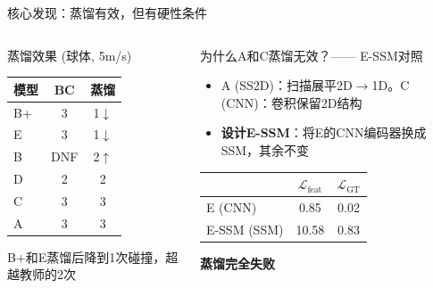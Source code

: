 \documentclass[aspectratio=169,10pt]{beamer}
\newcommand{\pos}[1]{\textcolor{positive}{#1}}
\newcommand{\con}[1]{\textcolor{negative}{#1}}
\newcommand{\HL}[1]{\textcolor{emphasis}{#1}}
\begin{document}
\begin{frame}{核心发现：蒸馏有效，但有硬性条件}
\begin{columns}[T]
\begin{block}{蒸馏效果 (球体, 5m/s)}
\centering\footnotesize
\begin{tabular}{lcc}
\toprule
模型 & BC & 蒸馏 \\
\midrule
\HL{B+} & 3 & \HL{1}$\downarrow$ \\
\HL{E} & 3 & \HL{1}$\downarrow$ \\
B & DNF & 2$\uparrow$ \\
D & 2 & 2 \\
C & 3 & 3 \\
A & 3 & 3 \\
\bottomrule
\end{tabular}
\vspace{0.1cm}
B+和E蒸馏后降到1次碰撞，\pos{超越教师的2次}
\end{block}

\begin{alertblock}{为什么A和C蒸馏无效？—— E-SSM对照}
\footnotesize
\begin{itemize}
\item A (SS2D)：扫描展平2D$\to$1D。C (CNN)：卷积保留2D结构
\item \textbf{设计E-SSM}：将E的CNN编码器换成SSM，其余不变
\end{itemize}
\vspace{0.2cm}
\centering
\begin{tabular}{lcc}
\toprule
& $\mathcal{L}_\text{feat}$ & $\mathcal{L}_\text{GT}$ \\
\midrule
E (CNN) & 0.85 & 0.02 \\
\con{E-SSM (SSM)} & \con{10.58} & \con{0.83} \\
\bottomrule
\end{tabular}
\vspace{0.1cm}
\textbf{\con{蒸馏完全失败}}
\end{alertblock}
\end{columns}
\end{frame}
\end{document}
